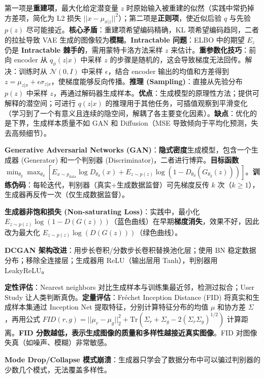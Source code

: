 \documentclass[
  8pt]{extarticle}
\begin{document}
\begin{multicols*}{4}
第一项是\textbf{重建项}，最大化给定潜变量 \(z\)
时原始输入被重建的似然（实践中常扔掉方差项，简化为 L2 损失
\(||x - \mu_{x|z}||^2\)）；第二项是\textbf{正则项}，使近似后验 \(q\)
与先验 \(p(z)\) 尽可能接近。\textbf{核心矛盾}：重建项希望编码精确，KL
项希望编码趋同，二者的拉扯导致 VAE
生成的图像较为\textbf{模糊}。\textbf{Intractable 问题}：ELBO 中的期望
\(E_z\) 仍是 \textbf{Intractable 棘手的}，需用蒙特卡洛方法采样 \(z\)
来估计。\textbf{重参数化技巧}：前向 encoder 从 \(q_\phi(z|x)\) 中采样
\(z\) 的步骤是随机的，这会导致梯度无法回传。解决：训练时从
\(\mathcal{N}(0, I)\) 中采样 \(\epsilon\)，结合 encoder
输出的均值和方差得到
\(z = \mu_{z|x} + \epsilon \sigma_{z|x}\)，使梯度能够反向传播。\textbf{推理
(Sampling)}：直接从先验分布 \(p(z)\) 中采样
\(z\)，再通过解码器生成样本。\textbf{优点}：生成模型的原理性方法；提供可解释的潜空间；可进行
\(q(z|x)\)
的推理用于其他任务，可插值观察到平滑变化（学习到了一个有意义且连续的隐空间，解耦了各主要变化因素）。\textbf{缺点}：优化的是下界，生成样本质量不如
GAN 和 Diffusion（MSE 导致倾向于平均化预测，失去高频细节）。

\textbf{Generative Adversarial Networks
(GAN)}：\textbf{隐式密度}生成模型，包含一个生成器 (Generator)
和一个判别器 (Discriminator)，二者进行博弈。\textbf{目标函数}
\(\min_{\theta_g} \max_{\theta_d} [E_{x \sim p_{\text{data}}} \log D_{\theta_d}(x) + E_{z \sim p(z)} \log(1 - D_{\theta_d}(G_{\theta_g}(z)))]\)。\textbf{训练伪码}：每轮迭代，判别器（真实+生成数据监督）可先梯度反传
\(k\) 次（\(k \ge 1\)），生成器再反传一次（仅生成数据监督）。

\textbf{生成器非饱和损失 (Non-saturating Loss)}：实践中，最小化
\(E_{z \sim p(z)} \log(1 - D(G(z)))\)（蓝色曲线）在早期\textbf{梯度消失}，效果不好，因此改为最大化
\(E_{z \sim p(z)} \log(D(G(z)))\)（绿色曲线）。

\textbf{DCGAN 架构改进}：用步长卷积/分数步长卷积替换池化层；使用 BN
稳定数据分布；移除全连接层；生成器用 ReLU（输出层用 Tanh），判别器用
LeakyReLU。

\textbf{定性评估}：Nearest neighbors
对比生成样本与训练集最近邻，检测过拟合；User Study
让人类判断真伪。\textbf{定量评估}：Fréchet Inception Distance (FID)
将真实和生成样本集通过 Inception Net 提取特征，分别计算特征分布的均值
\(\mu\) 和协方差 \(\Sigma\)，再用公式
\(FID(r, g) = ||\mu_r - \mu_g||_2^2 + \text{Tr}(\Sigma_r + \Sigma_g - 2(\Sigma_r \Sigma_g)^{1/2})\)
计算距离。\textbf{FID
分数越低，表示生成图像的质量和多样性越接近真实图像}。FID
对图像失真（如噪声、模糊）非常敏感。

\textbf{Mode Drop/Collapse
模式崩溃}：生成器只学会了数据分布中可以骗过判别器的少数几个模式，无法覆盖多样性。


\end{multicols*}
\end{document}
